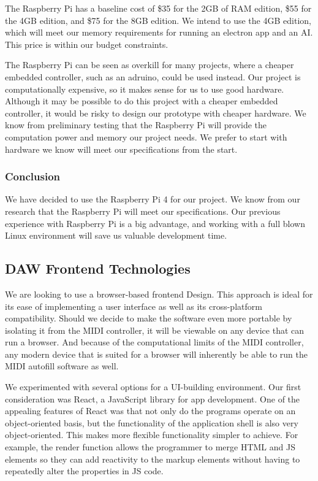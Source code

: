 The Raspberry Pi has a baseline cost of \$35 for the 2GB of RAM edition, \$55 for the 4GB
edition, and \$75 for the 8GB edition. We intend to use the 4GB edition, which will meet
our memory requirements for running an electron app and an AI. This price is within our
budget constraints.

The Raspberry Pi can be seen as overkill for many projects, where a cheaper embedded
controller, such as an adruino, could be used instead. Our project is computationally
expensive, so it makes sense for us to use good hardware. Although it may be possible to
do this project with a cheaper embedded controller, it would be risky to design our
prototype with cheaper hardware. We know from preliminary testing that the Raspberry Pi
will provide the computation power and memory our project needs. We prefer to start with
hardware we know will meet our specifications from the start.

\subsubsection{Conclusion}

We have decided to use the Raspberry Pi 4 for our project. We know from our research that
the Raspberry Pi will meet our specifications. Our previous experience with Raspberry Pi
is a big advantage, and working with a full blown Linux environment will save us valuable
development time.


\subsection{DAW Frontend Technologies}

We are looking to use a browser-based frontend Design. This approach is ideal for its ease
of implementing a user interface as well as its cross-platform compatibility. Should we
decide to make the software even more portable by isolating it from the MIDI controller,
it will be viewable on any device that can run a browser. And because of the computational
limits of the MIDI controller, any modern device that is suited for a browser will
inherently be able to run the MIDI autofill software as well.

We experimented with several options for a UI-building environment. Our first consideration was
React, a JavaScript library for app development. One of the appealing features of React was that
not only do the programs operate on an object-oriented basis, but the functionality of the
application shell is also very object-oriented. This makes more flexible functionality simpler to
achieve. For example, the render function allows the programmer to merge HTML and JS elements so
they can add reactivity to the markup elements without having to repeatedly alter the properties
in JS code.

